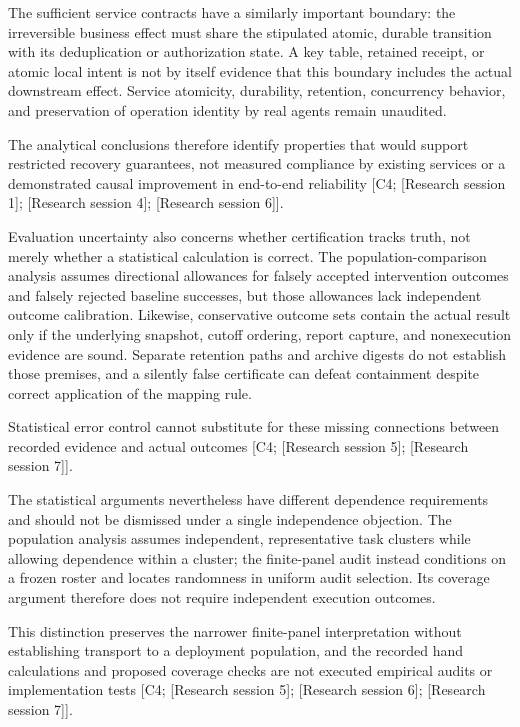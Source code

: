 \documentclass[11pt]{article}
\begin{document}
The sufficient service contracts have a similarly important boundary: the irreversible business effect must share the stipulated atomic, durable transition with its deduplication or authorization state. A key table, retained receipt, or atomic local intent is not by itself evidence that this boundary includes the actual downstream effect. Service atomicity, durability, retention, concurrency behavior, and preservation of operation identity by real agents remain unaudited.

The analytical conclusions therefore identify properties that would support restricted recovery guarantees, not measured compliance by existing services or a demonstrated causal improvement in end-to-end reliability [C4; [Research session 1]; [Research session 4]; [Research session 6]].

Evaluation uncertainty also concerns whether certification tracks truth, not merely whether a statistical calculation is correct. The population-comparison analysis assumes directional allowances for falsely accepted intervention outcomes and falsely rejected baseline successes, but those allowances lack independent outcome calibration. Likewise, conservative outcome sets contain the actual result only if the underlying snapshot, cutoff ordering, report capture, and nonexecution evidence are sound. Separate retention paths and archive digests do not establish those premises, and a silently false certificate can defeat containment despite correct application of the mapping rule.

Statistical error control cannot substitute for these missing connections between recorded evidence and actual outcomes [C4; [Research session 5]; [Research session 7]].

The statistical arguments nevertheless have different dependence requirements and should not be dismissed under a single independence objection. The population analysis assumes independent, representative task clusters while allowing dependence within a cluster; the finite-panel audit instead conditions on a frozen roster and locates randomness in uniform audit selection. Its coverage argument therefore does not require independent execution outcomes.

This distinction preserves the narrower finite-panel interpretation without establishing transport to a deployment population, and the recorded hand calculations and proposed coverage checks are not executed empirical audits or implementation tests [C4; [Research session 5]; [Research session 6]; [Research session 7]].
\end{document}
